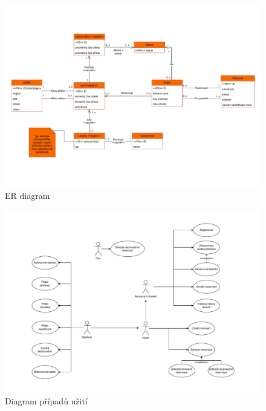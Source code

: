 \documentclass[11pt,a4paper,landscape]{article}
\begin{document}
\begin{center}
\begin{figure}[H]
        \includegraphics[scale=0.85]{diagrams/er-diagram.pdf}
        \caption{ER diagram}
        \label{fig:1}
\end{figure}
\begin{figure}[H]
        \includegraphics[scale=0.85]{diagrams/usecase-diagram.pdf}
        \caption{Diagram případů užití}
        \label{fig:2}
\end{figure}
\end{center}
\let\clearpage\relax
\end{document}
